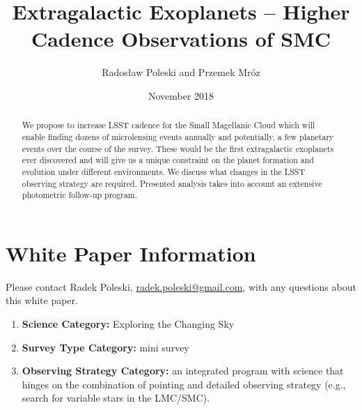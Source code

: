 \documentclass[12pt,letterpaper]{article}
\title{Extragalactic Exoplanets -- Higher Cadence Observations of SMC}
\author{Rados\l{}aw Poleski and Przemek Mr\'oz}
\date{November 2018}
\begin{document}
\maketitle

\begin{abstract}
We propose to increase LSST cadence for the Small Magellanic Cloud which will 
enable finding dozens of microlensing events annually and potentially, a few 
planetary events over the course of the survey.  These would be 
the first extragalactic exoplanets ever discovered and will give us a unique constraint on 
the planet formation and evolution under different environments.  We discuss what changes in 
the LSST observing strategy are required.  Presented analysis takes into account 
an extensive photometric follow-up program. 
\end{abstract}

\section{White Paper Information}
Please contact Radek Poleski, \url{radek.poleski@gmail.com}, with any questions about this white paper.  
\begin{enumerate} 
\item {\bf Science Category:} Exploring the Changing Sky
% 
\item {\bf Survey Type Category:} mini survey
\item {\bf Observing Strategy Category:} %
      an integrated program with science that hinges on the combination of pointing and detailed 
	observing strategy (e.g., search for variable stars in the 
	LMC/SMC). 
\end{enumerate}  
\end{document}
